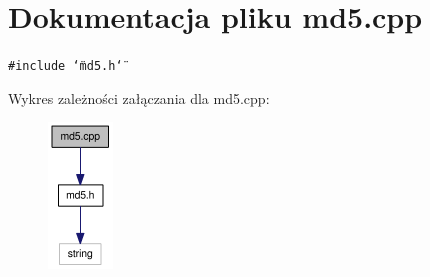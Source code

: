 \hypertarget{a00010}{
\section{Dokumentacja pliku md5.cpp}
\label{d7/dec/a00010}
}
{\tt \#include \char`\"{}md5.h\char`\"{}}\par


Wykres zależności załączania dla md5.cpp:\nopagebreak
\begin{figure}[H]
\begin{center}
\leavevmode
\includegraphics[width=49pt]{dd/d32/a00041}
\end{center}
\end{figure}
